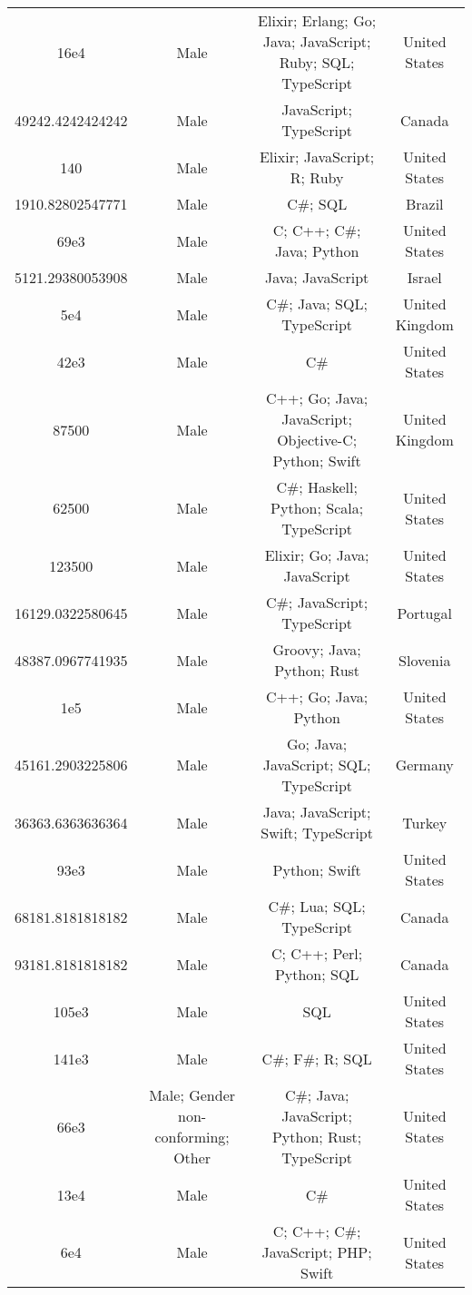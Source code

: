 \begin{center}
\begin{tabular}{ |c|c|c|c| }
16e4  &  Male  &  Elixir; Erlang; Go; Java; JavaScript; Ruby; SQL; TypeScript  &  United States  \\ 
49242.4242424242  &  Male  &  JavaScript; TypeScript  &  Canada  \\ 
140  &  Male  &  Elixir; JavaScript; R; Ruby  &  United States  \\ 
1910.82802547771  &  Male  &  C\#; SQL  &  Brazil  \\ 
69e3  &  Male  &  C; C++; C\#; Java; Python  &  United States  \\ 
5121.29380053908  &  Male  &  Java; JavaScript  &  Israel  \\ 
5e4  &  Male  &  C\#; Java; SQL; TypeScript  &  United Kingdom  \\ 
42e3  &  Male  &  C\#  &  United States  \\ 
87500  &  Male  &  C++; Go; Java; JavaScript; Objective-C; Python; Swift  &  United Kingdom  \\ 
62500  &  Male  &  C\#; Haskell; Python; Scala; TypeScript  &  United States  \\ 
123500  &  Male  &  Elixir; Go; Java; JavaScript  &  United States  \\ 
16129.0322580645  &  Male  &  C\#; JavaScript; TypeScript  &  Portugal  \\ 
48387.0967741935  &  Male  &  Groovy; Java; Python; Rust  &  Slovenia  \\ 
1e5  &  Male  &  C++; Go; Java; Python  &  United States  \\ 
45161.2903225806  &  Male  &  Go; Java; JavaScript; SQL; TypeScript  &  Germany  \\ 
36363.6363636364  &  Male  &  Java; JavaScript; Swift; TypeScript  &  Turkey  \\ 
93e3  &  Male  &  Python; Swift  &  United States  \\ 
68181.8181818182  &  Male  &  C\#; Lua; SQL; TypeScript  &  Canada  \\ 
93181.8181818182  &  Male  &  C; C++; Perl; Python; SQL  &  Canada  \\ 
105e3  &  Male  &  SQL  &  United States  \\ 
141e3  &  Male  &  C\#; F\#; R; SQL  &  United States  \\ 
66e3  &  Male; Gender non-conforming; Other  &  C\#; Java; JavaScript; Python; Rust; TypeScript  &  United States  \\ 
13e4  &  Male  &  C\#  &  United States  \\ 
6e4  &  Male  &  C; C++; C\#; JavaScript; PHP; Swift  &  United States  \\ 

\end{tabular}
\end{center}
